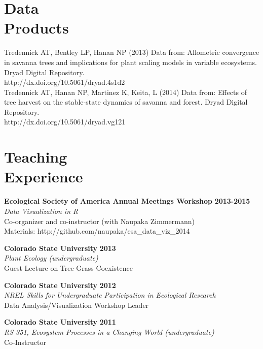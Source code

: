 \documentclass[margin,line]{resume}
\begin{document}
\begin{resume}
    \section{\mysidestyle Data\\Products}
    Tredennick AT, Bentley LP, Hanan NP (2013) Data from: Allometric convergence in savanna trees and implications for plant scaling models in variable ecosystems. Dryad Digital Repository. \\ http://dx.doi.org/10.5061/dryad.4s1d2 \vspace{-6mm}\\%
    
    Tredennick AT, Hanan NP, Martinez K, Keita, L (2014) Data from: Effects of tree harvest on the stable-state dynamics of savanna and forest. Dryad Digital Repository. \\ http://dx.doi.org/10.5061/dryad.vg121
    
    \section{\mysidestyle Teaching\\Experience}
    \textbf{Ecological Society of America Annual Meetings Workshop} \hfill \textbf{2013-2015}\\
    		\textsl{Data Visualization in R}\\
		Co-organizer and co-instructor (with Naupaka Zimmermann)\\
		Materials: http://github.com/naupaka/esa\_data\_viz\_2014
    
    \textbf{Colorado State University} \hfill \textbf{2013}\\
               \textsl{Plant Ecology (undergraduate)}\\
               Guest Lecture on Tree-Grass Coexistence
               
    \textbf{Colorado State University} \hfill \textbf{2012}\\ 
               \textsl{NREL Skills for Undergraduate Participation in Ecological Research}\\
               Data Analysis/Visualization Workshop Leader
               
    \textbf{Colorado State University} \hfill \textbf{2011}\\ 
               \textsl{RS 351, Ecosystem Processes in a Changing World (undergraduate)}\\
               Co-Instructor 
               

\end{resume}
\end{document}

